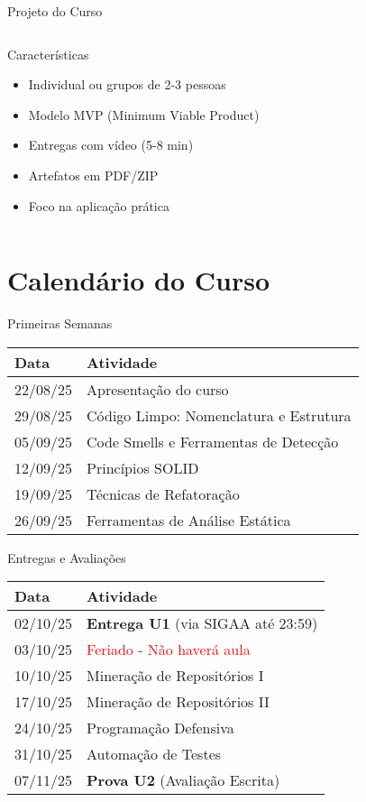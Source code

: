 \documentclass[10pt, aspectratio=169]{beamer}
\begin{document}
\begin{frame}{Projeto do Curso}
\begin{columns}
\begin{column}{0.6\textwidth}
\begin{block}{Características}
\begin{itemize}
    \item Individual ou grupos de 2-3 pessoas
    \item Modelo MVP (Minimum Viable Product)
    \item Entregas com vídeo (5-8 min)
    \item Artefatos em PDF/ZIP
    \item Foco na aplicação prática
\end{itemize}
\end{block}
\end{column}
\end{columns}
\end{frame}

\section{Calendário do Curso}
\begin{frame}{Primeiras Semanas}
\begin{table}
\scriptsize
\centering
\begin{tabular}{ll}
\toprule
\textbf{Data} & \textbf{Atividade} \\
\midrule
22/08/25 & Apresentação do curso \\
29/08/25 & Código Limpo: Nomenclatura e Estrutura \\
05/09/25 & Code Smells e Ferramentas de Detecção \\
12/09/25 & Princípios SOLID \\
19/09/25 & Técnicas de Refatoração \\
26/09/25 & Ferramentas de Análise Estática \\
\bottomrule
\end{tabular}
\end{table}
\end{frame}

\begin{frame}{Entregas e Avaliações}
\begin{table}
\scriptsize
\centering
\begin{tabular}{ll}
\toprule
\textbf{Data} & \textbf{Atividade} \\
\midrule
02/10/25 & \textbf{Entrega U1} (via SIGAA até 23:59) \\
03/10/25 & \textcolor{red}{Feriado - Não haverá aula} \\
10/10/25 & Mineração de Repositórios I \\
17/10/25 & Mineração de Repositórios II \\
24/10/25 & Programação Defensiva \\
31/10/25 & Automação de Testes \\
07/11/25 & \textbf{Prova U2} (Avaliação Escrita) \\
\bottomrule
\end{tabular}
\end{table}
\end{frame}
\end{document}
